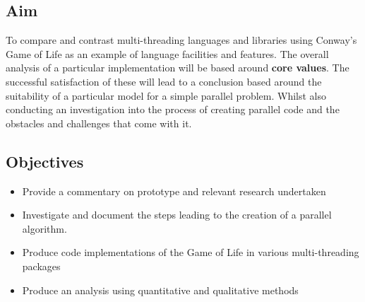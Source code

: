 \documentclass[11pt]{article} %
\begin{document}
\subsection{Aim}
To compare and contrast multi-threading languages and libraries using Conway's Game of Life as an example of language facilities and features. The overall analysis of a particular implementation will be based around {\bf core values}. The successful satisfaction of these will lead to a conclusion based around the suitability of a particular model for a simple parallel problem. Whilst also conducting an investigation into the process of creating parallel code and the obstacles and challenges that come with it.
\subsection{Objectives}
\begin{itemize}
\item Provide a commentary on prototype and relevant research undertaken
\item Investigate and document the steps leading to the creation of a parallel algorithm.
\item Produce code implementations of the Game of Life in various multi-threading packages
\item Produce an analysis using quantitative and qualitative methods
\end{itemize}
\end{document}
